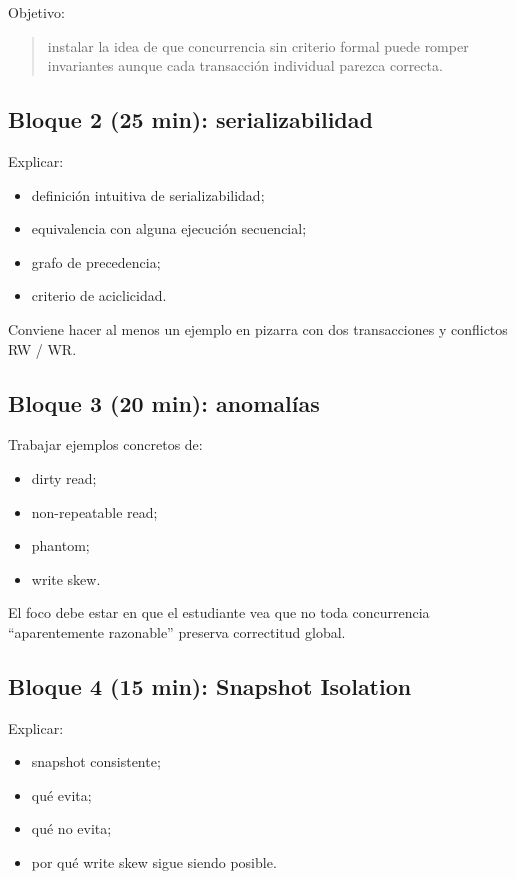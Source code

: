 \documentclass[variant=docente,cover=institutional,mode=screen]{ua-engineering-v6-article}
\begin{document}
Objetivo:
\begin{quote}
instalar la idea de que concurrencia sin criterio formal puede romper invariantes aunque cada transacción individual parezca correcta.
\end{quote}

\subsection*{Bloque 2 (25 min): serializabilidad}

Explicar:

\begin{itemize}
\item definición intuitiva de serializabilidad;
\item equivalencia con alguna ejecución secuencial;
\item grafo de precedencia;
\item criterio de aciclicidad.
\end{itemize}

Conviene hacer al menos un ejemplo en pizarra con dos transacciones y conflictos RW / WR.

\subsection*{Bloque 3 (20 min): anomalías}

Trabajar ejemplos concretos de:

\begin{itemize}
\item dirty read;
\item non-repeatable read;
\item phantom;
\item write skew.
\end{itemize}

El foco debe estar en que el estudiante vea que no toda concurrencia “aparentemente razonable” preserva correctitud global.

\subsection*{Bloque 4 (15 min): Snapshot Isolation}

Explicar:

\begin{itemize}
\item snapshot consistente;
\item qué evita;
\item qué no evita;
\item por qué write skew sigue siendo posible.
\end{itemize}
\end{document}
